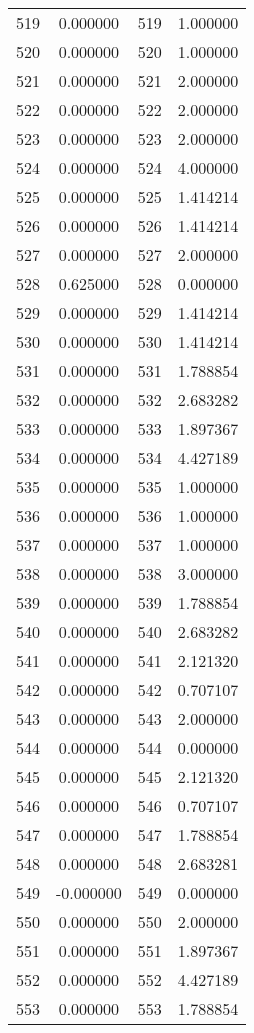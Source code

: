 \documentclass[12pt]{article}
\begin{document}
\begin{longtable}{@{}cccc@{}}
519 & 0.000000 & 519 & 1.000000 \\
520 & 0.000000 & 520 & 1.000000 \\
521 & 0.000000 & 521 & 2.000000 \\
522 & 0.000000 & 522 & 2.000000 \\
523 & 0.000000 & 523 & 2.000000 \\
524 & 0.000000 & 524 & 4.000000 \\
525 & 0.000000 & 525 & 1.414214 \\
526 & 0.000000 & 526 & 1.414214 \\
527 & 0.000000 & 527 & 2.000000 \\
528 & 0.625000 & 528 & 0.000000 \\
529 & 0.000000 & 529 & 1.414214 \\
530 & 0.000000 & 530 & 1.414214 \\
531 & 0.000000 & 531 & 1.788854 \\
532 & 0.000000 & 532 & 2.683282 \\
533 & 0.000000 & 533 & 1.897367 \\
534 & 0.000000 & 534 & 4.427189 \\
535 & 0.000000 & 535 & 1.000000 \\
536 & 0.000000 & 536 & 1.000000 \\
537 & 0.000000 & 537 & 1.000000 \\
538 & 0.000000 & 538 & 3.000000 \\
539 & 0.000000 & 539 & 1.788854 \\
540 & 0.000000 & 540 & 2.683282 \\
541 & 0.000000 & 541 & 2.121320 \\
542 & 0.000000 & 542 & 0.707107 \\
543 & 0.000000 & 543 & 2.000000 \\
544 & 0.000000 & 544 & 0.000000 \\
545 & 0.000000 & 545 & 2.121320 \\
546 & 0.000000 & 546 & 0.707107 \\
547 & 0.000000 & 547 & 1.788854 \\
548 & 0.000000 & 548 & 2.683281 \\
549 & -0.000000 & 549 & 0.000000 \\
550 & 0.000000 & 550 & 2.000000 \\
551 & 0.000000 & 551 & 1.897367 \\
552 & 0.000000 & 552 & 4.427189 \\
553 & 0.000000 & 553 & 1.788854 \\

\end{longtable}
\end{document}
